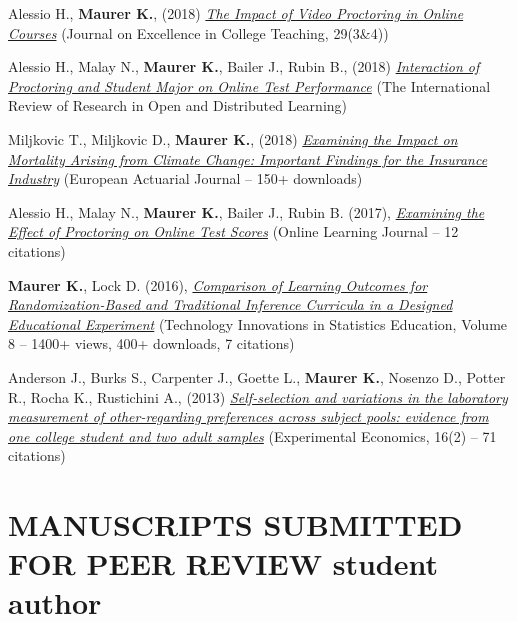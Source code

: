 \documentclass[margin, 10pt]{res}\usepackage[]{graphicx}\usepackage[]{color}
\begin{document}
\begin{resume}
Alessio H., \textbf{Maurer K.}, (2018) \href{http://celt.muohio.edu/ject/fetch.php?id=734}{\it The Impact of Video Proctoring in Online Courses} (Journal on Excellence in College Teaching, 29(3&4)) 

Alessio H., Malay N., \textbf{Maurer K.}, Bailer J., Rubin B., (2018) \href{http://www.irrodl.org/index.php/irrodl/article/view/3698/4843}{\it Interaction of Proctoring and Student Major on Online Test Performance} (The International Review of Research in Open and Distributed Learning) 

Miljkovic T., Miljkovic D., \textbf{Maurer K.}, (2018) \href{https://link.springer.com/article/10.1007/s13385-018-0178-2}{\it Examining the Impact on Mortality Arising from Climate Change: Important Findings for the Insurance Industry} (European Actuarial Journal -- 150+ downloads)

Alessio H., Malay N., \textbf{Maurer K.}, Bailer J., Rubin B. (2017), \href{https://olj.onlinelearningconsortium.org/index.php/olj/article/view/885}{{\it Examining the Effect of Proctoring on Online Test Scores}} (Online Learning Journal -- 12 citations) 

\textbf{Maurer K.}, Lock D. (2016), \href{http://escholarship.org/uc/item/0wm523b0}{{\it Comparison of Learning Outcomes for Randomization-Based and Traditional Inference Curricula in a Designed Educational Experiment}} (Technology Innovations in Statistics Education, Volume 8 -- 1400+ views, 400+ downloads, 7 citations)

Anderson J., Burks S., Carpenter J., Goette L., \textbf{Maurer K.}, Nosenzo D., Potter R., Rocha K., Rustichini A., (2013) \href{https://link.springer.com/article/10.1007/s10683-012-9327-7}{{\it Self-selection and variations in the laboratory measurement of other-regarding preferences across subject pools: evidence from one college student and two adult samples}} (Experimental Economics, 16(2) -- 71 citations)

  
\section{MANUSCRIPTS SUBMITTED FOR PEER REVIEW \newline \newline *student author} 


\end{resume}
\end{document}
